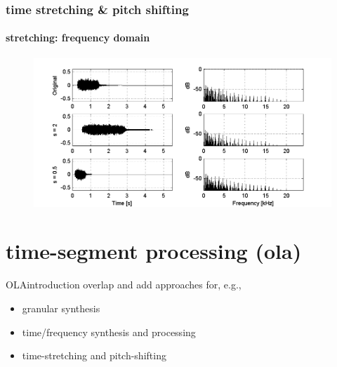 \begin{frame}\frametitle{time stretching \& pitch shifting}\framesubtitle{stretching: frequency domain}
		\begin{figure}
			\centerline{\includegraphics[scale=.7]{graph/fx4_timestretchintro}}
		\end{figure}
\end{frame}
   
    \section[ola]{time-segment processing (ola)}
    \begin{frame}{OLA}{introduction}
        overlap and add approaches for, e.g.,
        
        \begin{itemize}
            \item   granular synthesis
            \item   time/frequency synthesis and processing
            \item   {time-stretching and pitch-shifting}
        \end{itemize}
    \end{frame}

